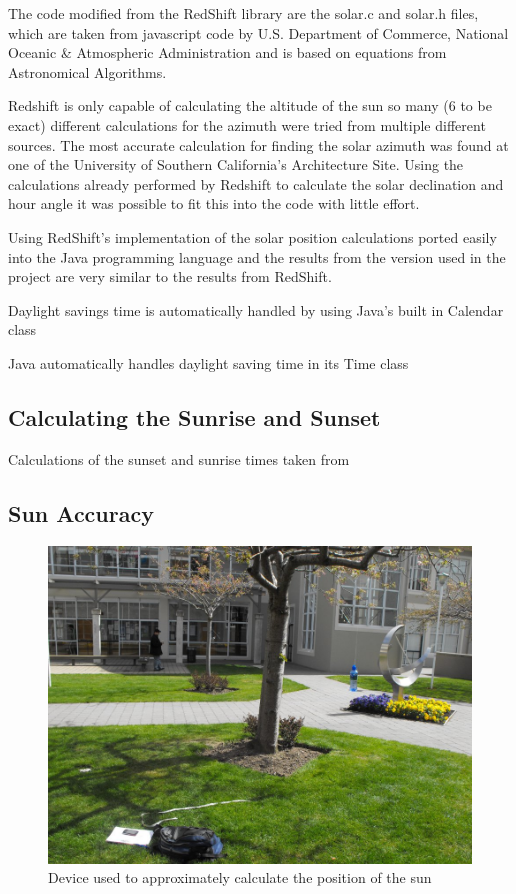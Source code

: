 \documentclass[12pt]{report}
\begin{document}
The code modified from the RedShift library are the solar.c and solar.h files, which are taken from javascript code by U.S. Department of Commerce, National Oceanic & Atmospheric Administration\cite{usnoaa} and is based on equations from Astronomical Algorithms\cite{astronomicalalgorithms}. 

Redshift is only capable of calculating the altitude of the sun so many (6 to be exact) different calculations for the azimuth were tried from multiple different sources. The most accurate calculation for finding the solar azimuth was found at one of the University of Southern California's Architecture Site\cite{solarazi}. Using the calculations already performed by Redshift to calculate the solar declination and hour angle it was possible to fit this into the code with little effort.

Using RedShift's implementation of the solar position calculations ported easily into the Java programming language and the results from the version used in the project are very similar to the results from RedShift.

Daylight savings time is automatically handled by using Java's built in Calendar class

Java automatically handles daylight saving time in its Time class

\subsection{Calculating the Sunrise and Sunset}
Calculations of the sunset and sunrise times taken from \cite{sunrise} 
\subsection{Sun Accuracy}
\begin{figure}
\includegraphics[scale=0.4]{contraption.jpg}
\caption{Device used to approximately calculate the position of the sun}
\label{sun-contraption}
\end{figure}
\end{document}
